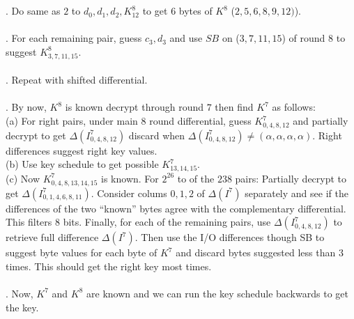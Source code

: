 \\
\\
. Do same as $2$ to $d_0, d_1, d_2, K_{12}^8$ to get $6$ bytes of $K^8$ ($2,5,6,8,9,12)$).
\\
\\
. For each remaining pair, guess $c_3, d_3$ and use $SB$ on ($3,7,11,15$) of round $8$
to suggest $K^8_{3,7,11,15}$.
\\
\\
. Repeat with shifted differential.
\\
\\
. By now, $K^8$ is known decrypt through round $7$ then find $K^7$ as follows:
\\
\jt \jt (a) For right pairs, under main $8$ round differential, guess $K^7_{0,4,8,12}$ and
partially decrypt to get 
$\Delta(I^7_{0,4,8,12})$ discard when
$\Delta(I^7_{0,4,8,12}) \ne ( \alpha, \alpha , \alpha, \alpha)$.  Right differences suggest
right key values.
\\
\jt \jt (b) Use key schedule to get possible $K^7_{13,14,15}$.
\\
\jt \jt (c) Now $K^7_{0,4,8,13,14,15}$ is known.
For $2^{26}$ to of the $2{38}$ pairs: Partially decrypt to get 
$\Delta(I^7_{0,1,4,6,8,11})$.  Consider colums $0,1,2$ of $\Delta(I^7)$ separately and
see if the differences of the two ``known'' bytes agree with the complementary differential.
This filters $8$ bits.  Finally, for each of the remaining pairs, use
$\Delta(I^7_{0,4,8,12})$ to retrieve full difference $\Delta(I^7)$.  Then use the I/O differences
though SB to suggest byte values for each byte of $K^7$ and discard bytes suggested less than
$3$ times.  This should get the right key most times.
\\
\\
. Now, $K^7$ and $K^8$ are known and we can run the key schedule backwards to get the key.

